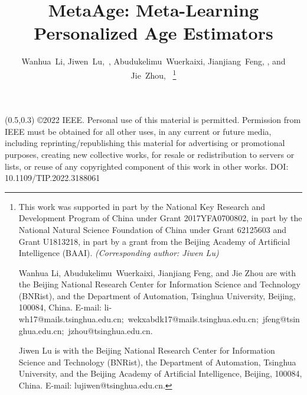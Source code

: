 \documentclass[journal,twoside]{IEEEtran}
\newcommand{\copyrightstatement}{
    \begin{textblock}{15}(0.5,0.3)    \noindent
         \centering
         \textblockcolour{white}
         \footnotesize
         \copyright 2022 IEEE. Personal use of this material is permitted. Permission from IEEE must be obtained for all other uses, in any current or future media, including reprinting/republishing this material for advertising or promotional purposes, creating new collective works, for resale or redistribution to servers or lists, or reuse of any copyrighted component of this work in other works. DOI: 10.1109/TIP.2022.3188061
    \end{textblock}
}
\begin{document}
\title{MetaAge: Meta-Learning Personalized Age Estimators}

\copyrightstatement


\author{Wanhua~Li, Jiwen~Lu,~, Abudukelimu~Wuerkaixi,
Jianjiang~Feng, , and Jie~Zhou,~
\thanks{
This work was supported in part by the National Key Research and Development Program of China under Grant 2017YFA0700802, in part by the National Natural Science Foundation of China under Grant 62125603 and Grant U1813218, in part by a grant from the Beijing Academy of Artificial Intelligence (BAAI).
\emph{(Corresponding author: Jiwen Lu)}


Wanhua Li, Abudukelimu~Wuerkaixi, Jianjiang Feng, and Jie Zhou are with the Beijing National Research Center for Information Science and Technology (BNRist), and the Department of Automation, Tsinghua University, Beijing, 100084, China.
E-mail: li-wh17@mails.tsinghua.edu.cn;~wekxabdk17@mails.tsinghua.edu.cn;~jfeng@tsinghua.edu.cn;~jzhou@tsinghua.edu.cn.

Jiwen Lu is with the Beijing National Research Center for Information Science and Technology (BNRist), the Department of Automation, Tsinghua University, and the Beijing Academy of Artificial Intelligence, Beijing, 100084, China. E-mail: lujiwen@tsinghua.edu.cn.

}
}
\maketitle
\end{document}
